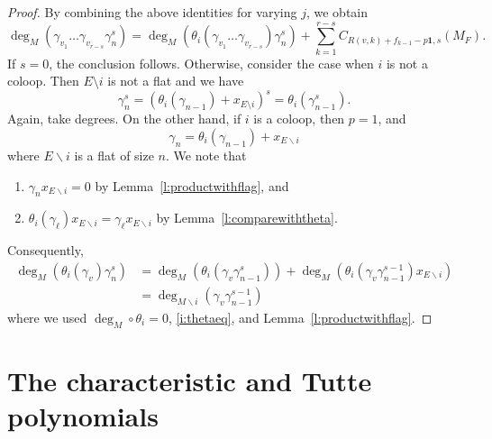 \documentclass[ALCO,published]{cedram}
\numberwithin{equation}{section}
\numberwithin{figure}{section}
\begin{document}
\begin{proof}
    By combining the above identities for varying $j$, we obtain
    \[\deg_M(\gamma_{v_1}\dots\gamma_{v_{r-s}}\gamma_n^s)=
    \deg_M(\theta_i(\gamma_{v_1}\dots\gamma_{v_{r-s}})\gamma_n^s)+\sum_{k=1}^{r-s}C_{R(v,k)+f_{k-1}-p\mathbf{1},s}(M_F).\]
    If $s=0$, the conclusion follows. Otherwise, consider the case when 
    $i$ is not a coloop. Then $E\setminus i$ is not a flat and we have 
    \[\gamma_n^s=(\theta_i(\gamma_{n-1})+x_{E\setminus i})^s=\theta_i(\gamma_{n-1}^s).\]
    Again, take degrees. On the other hand, if $i$ is a coloop, then $p=1$, and
    \[\gamma_n=\theta_i(\gamma_{n-1})+x_{E\backslash i}\]
    where $E\backslash i$ is a flat of size $n$. We note that
    \begin{enumerate}
        \item $\gamma_n x_{E\backslash i}=0$ by Lemma~\ref{l:productwithflag}, and
        \item \label{i:thetaeq}  $\theta_i(\gamma_{\ell})x_{E\backslash i}=\gamma_{\ell} x_{E\backslash i}$ by Lemma~\ref{l:comparewiththeta}.  
    \end{enumerate}
    Consequently,
    \begin{align*}
    \deg_M(\theta_i(\gamma_v)\gamma_n^s)&=\deg_M(\theta_i(\gamma_v\gamma_{n-1}^s))+\deg_M(\theta_i(\gamma_v\gamma_{n-1}^{s-1})x_{E\backslash i})\\
    &=\deg_{M\backslash i}(\gamma_v\gamma_{n-1}^{s-1})
   \end{align*}
    where we used $\deg_M\circ\theta_i=0$, \eqref{i:thetaeq}, and Lemma~\ref{l:productwithflag}.
\end{proof}


\section{The characteristic and Tutte polynomials} \label{s:tutte}
\end{document}
